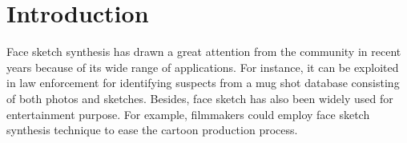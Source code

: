 \documentclass[10pt,twocolumn,letterpaper]{article}
\providecommand{\DIFaddbegin}{} %
\providecommand{\DIFaddend}{} %
\providecommand{\DIFdelbegin}{} %
\providecommand{\DIFdelend}{} %
\begin{document}
\DIFdelbegin %
\DIFdelend %
\section{Introduction}
\DIFdelbegin %
\DIFdelend \DIFaddbegin 

\DIFaddend Face sketch synthesis has drawn a great attention from the community in recent years because of its wide range of applications. For instance, it can be exploited in law enforcement for identifying suspects from a mug shot database consisting of both photos and sketches. Besides, face sketch has also been widely used for entertainment purpose. For example, filmmakers could employ face sketch synthesis technique to ease the cartoon production process.
\DIFdelbegin %
\DIFdelend \DIFaddbegin 
\end{document}
